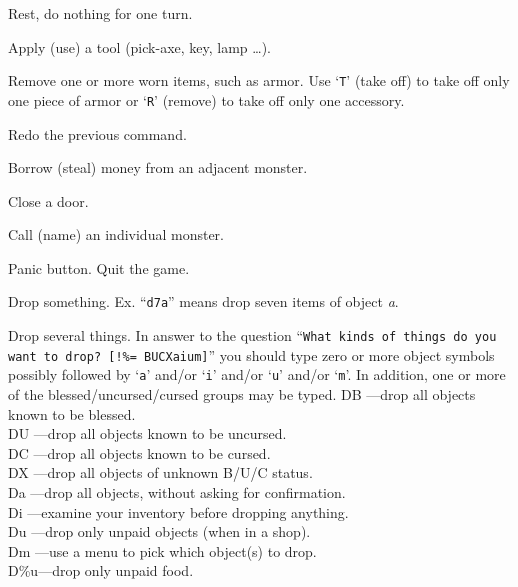 \item[\tb{.}]
Rest, do nothing for one turn.

\item[\tb{{\rm a}}]
Apply (use) a tool (pick-axe, key, lamp \ldots).

\item[\tb{{\rm A}}]
Remove one or more worn items, such as armor.
Use `{\tt T}' (take off) to take off only one piece of armor 
or `{\tt R}' (remove) to take off only one accessory.

\item[\tb{\^{}{\rm A}}]
Redo the previous command.

\item[\tb{\^{}{\rm B}}]
Borrow (steal) money from an adjacent monster.

\item[\tb{{\rm c}}]
Close a door.

\item[\tb{{\rm C}}]
Call (name) an individual monster.

\item[\tb{\^{}{\rm C}}]
Panic button.  Quit the game.

\item[\tb{{\rm d}}]
Drop something.  Ex. ``{\tt d7a}'' means drop seven items of object {\it a}.

\item[\tb{{\rm D}}]
Drop several things.  In answer to the question
``{\tt What kinds of things do you want to drop? [!\%= BUCXaium]}''
you should type zero or more object symbols possibly followed by 
`{\tt a}' and/or `{\tt i}' and/or `{\tt u}' and/or `{\tt m}'.  In addition, one or more of
the blessed/uncursed/cursed groups may be typed.
DB ---drop all objects known to be blessed.\\
DU ---drop all objects known to be uncursed.\\
DC ---drop all objects known to be cursed.\\
DX ---drop all objects of unknown B/U/C status.\\
Da ---drop all objects, without asking for confirmation.\\
Di ---examine your inventory before dropping anything.\\
Du ---drop only unpaid objects (when in a shop).\\
Dm ---use a menu to pick which object(s) to drop.\\
D\%u---drop only unpaid food.

